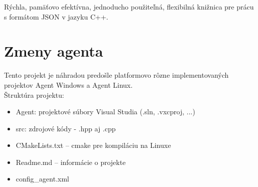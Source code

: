 \documentclass[a4paper,12pt]{article}
\begin{document}
Rýchla, pamäťovo efektívna, jednoducho použiteľná, flexibilná knižnica pre prácu s formátom JSON v jazyku C++. 

\section{Zmeny agenta}

Tento projekt je náhradou predošle platformovo rôzne implementovaných projektov Agent Windows a Agent Linux. \\

\noindent Štruktúra projektu:
\begin{itemize} 
	\item Agent: projektové súbory Visual Studia (.sln, .vxcproj, ...) 
	\item src: zdrojové kódy - .hpp aj .cpp 
	\item CMakeLists.txt – cmake pre kompiláciu na Linuxe 
	\item Readme.md – informácie o projekte 
	\item config\_agent.xml \\
\end{itemize}
\end{document}
